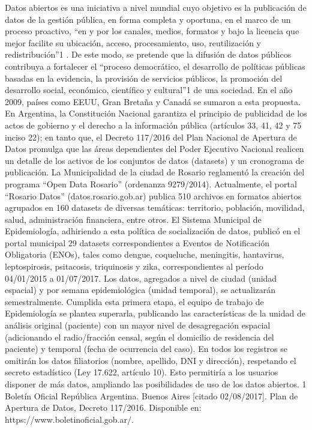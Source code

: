 {Datos abiertos es una iniciativa a nivel mundial cuyo objetivo es la publicación de datos de la gestión pública, en forma completa y oportuna, en el marco de un proceso proactivo, “en y por los canales, medios, formatos y bajo la licencia que mejor facilite su ubicación, acceso, procesamiento, uso, reutilización y redistribución”1 . De este modo, se pretende que la difusión de datos públicos contribuya a fortalecer el “proceso democrático, el desarrollo de políticas públicas basadas en la evidencia, la provisión de servicios públicos, la promoción del desarrollo social, económico, científico y cultural”1 de una sociedad. En el año 2009, países como EEUU, Gran Bretaña y Canadá se sumaron a esta propuesta. En Argentina, la Constitución Nacional garantiza el principio de publicidad de los actos de gobierno y el derecho a la información pública (artículos 33, 41, 42 y 75 inciso 22); en tanto que, el Decreto 117/2016 del Plan Nacional de Apertura de Datos promulga que las áreas dependientes del Poder Ejecutivo Nacional realicen un detalle de los activos de los conjuntos de datos (datasets) y un cronograma de publicación. La Municipalidad de la ciudad de Rosario reglamentó la creación del programa “Open Data Rosario” (ordenanza 9279/2014). Actualmente, el portal “Rosario Datos” (datos.rosario.gob.ar) publica 510 archivos en formatos abiertos agrupados en 160 datasets de diversas temáticas: territorio, población, movilidad, salud, administración financiera, entre otros. El Sistema Municipal de Epidemiología, adhiriendo a esta política de socialización de datos, publicó en el portal municipal 29 datasets correspondientes a Eventos de Notificación Obligatoria (ENOs), tales como dengue, coqueluche, meningitis, hantavirus, leptospirosis, psitacosis, triquinosis y zika, correspondientes al período 04/01/2015 a 01/07/2017. Los datos, agregados a nivel de ciudad (unidad espacial) y por semana epidemiológica (unidad temporal), se actualizarán semestralmente. Cumplida esta primera etapa, el equipo de trabajo de Epidemiología se plantea superarla, publicando las características de la unidad de análisis original (paciente) con un mayor nivel de desagregación espacial (adicionando el radio/fracción censal, según el domicilio de residencia del paciente) y temporal (fecha de ocurrencia del caso). En todos los registros se omitirán los datos filiatorios (nombre, apellido, DNI y dirección), respetando el secreto estadístico (Ley 17.622, artículo 10). Esto permitiría a los usuarios disponer de más datos, ampliando las posibilidades de uso de los datos abiertos. 1 Boletín Oficial República Argentina. Buenos Aires [citado 02/08/2017]. Plan de Apertura de Datos, Decreto 117/2016. Disponible en: https://www.boletinoficial.gob.ar/.}

